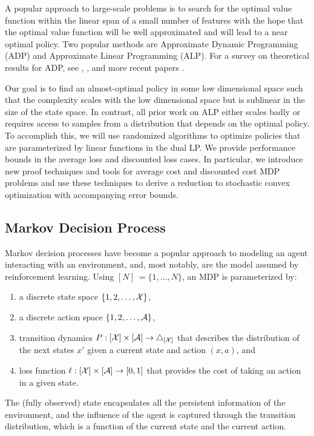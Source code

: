 \documentclass[11pt]{article}
\newcounter{assumption}%
\begin{document}
A popular approach to large-scale problems is to search for the optimal value function within the linear span of a small number of features with the hope that the optimal value function will be well approximated and will lead to a near optimal policy. Two popular methods are Approximate Dynamic Programming (ADP) and Approximate Linear Programming (ALP). For a survey on theoretical results for ADP, see \citep{Bertsekas-Tsitsiklis-1996}, \citep[Vol. 2, Chapter 6]{Bertsekas-2007}, and more recent papers \citep{Sutton-Szepesvari-Maei-2009, Sutton-Maei-Precup-Bhatnagar-Silver-Szepesvari-Wiewiora-2009, Maei-Szepesvari-Bhatnagar-Precup-Silver-Sutton-2009, Maei-Szepesvari-Bhatnagar-Sutton-2010}.

Our goal is to find an almost-optimal policy in some low dimensional space such that the complexity scales with the low dimensional space but is sublinear in the size of the state space. In contrast, all prior work on ALP either scales badly or requires access to samples from a distribution that depends on the optimal policy. To accomplish this, we will use randomized algorithms to optimize policies that are parameterized by linear functions in the dual LP. We provide performance bounds in the average loss and discounted loss cases. In particular, we introduce new proof techniques and tools for average cost and discounted cost MDP problems and use these techniques to derive a reduction to stochastic convex optimization with accompanying error bounds.



\subsection{Markov Decision Process}
Markov decision processes have become a popular approach to modeling an agent interacting with an environment, and, most notably, are the model assumed by reinforcement learning. Using $[N]\:=\{1,\ldots, N\}$, an MDP is parameterized by:
\begin{enumerate}
\item a discrete state space $\{1,2,\ldots, {\cal X}\}$,
\item a discrete action space $\{1,2,\ldots, {\cal A}\}$,
\item transition dynamics $P:[{\cal X}]\times[{\cal A}]\rightarrow\triangle_{[{\cal X}]}$ that describes the distribution of the next states $x'$ given a current state and action $(x,a)$, and
\item loss function $\ell:[{\cal X}]\times [{\cal A}] \rightarrow [0,1]$ that provides the cost of taking an action in a given state.
\end{enumerate}
The (fully observed) state encapsulates all the persistent information of the environment, and the influence of the agent is captured through the transition distribution, which is a function of the current state and the current action.
\end{document}
